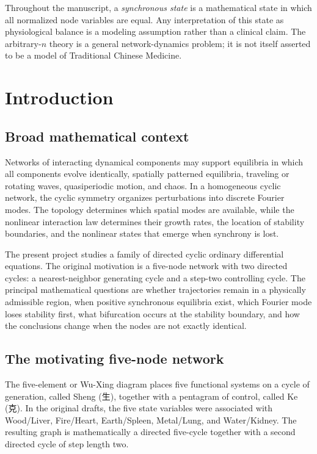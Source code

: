 \documentclass[11pt, reqno]{amsart}
\theoremstyle{definition}
\theoremstyle{remark}
\begin{document}
Throughout the manuscript, a \emph{synchronous state} is a mathematical state
in which all normalized node variables are equal.  Any interpretation of this
state as physiological balance is a modeling assumption rather than a clinical
claim.  The arbitrary-$n$ theory is a general network-dynamics problem; it is
not itself asserted to be a model of Traditional Chinese Medicine.

\section{Introduction}
\label{sec:introduction}

\subsection{Broad mathematical context}

Networks of interacting dynamical components may support equilibria in which
all components evolve identically, spatially patterned equilibria, traveling or
rotating waves, quasiperiodic motion, and chaos.  In a homogeneous cyclic
network, the cyclic symmetry organizes perturbations into discrete Fourier
modes.  The topology determines which spatial modes are available, while the
nonlinear interaction law determines their growth rates, the location of
stability boundaries, and the nonlinear states that emerge when synchrony is
lost.

The present project studies a family of directed cyclic ordinary differential
equations.  The original motivation is a five-node network with two directed
cycles: a nearest-neighbor generating cycle and a step-two controlling cycle.
The principal mathematical questions are whether trajectories remain in a
physically admissible region, when positive synchronous equilibria exist, which
Fourier mode loses stability first, what bifurcation occurs at the stability
boundary, and how the conclusions change when the nodes are not exactly
identical.

\subsection{The motivating five-node network}

The five-element or Wu-Xing diagram places five functional systems on a cycle
of generation, called Sheng (生), together with a pentagram of control, called
Ke (克).  In the original drafts, the five state variables were associated with
Wood/Liver, Fire/Heart, Earth/Spleen, Metal/Lung, and Water/Kidney.  The
resulting graph is mathematically a directed five-cycle together with a second
directed cycle of step length two.
\end{document}
